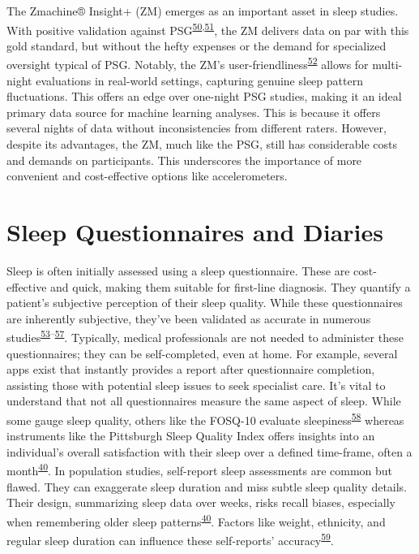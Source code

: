 \documentclass[
  10pt,
]{scrbook}
\begin{document}
The Zmachine® Insight+ (ZM) emerges as an important asset in sleep
studies. With positive validation against
PSG\textsuperscript{\protect\hyperlink{ref-kaplan_performance_2014}{50},\protect\hyperlink{ref-wang_evaluation_2015}{51}},
the ZM delivers data on par with this gold standard, but without the
hefty expenses or the demand for specialized oversight typical of PSG.
Notably, the ZM's
user-friendliness\textsuperscript{\protect\hyperlink{ref-pedersen_self-administered_2021}{52}}
allows for multi-night evaluations in real-world settings, capturing
genuine sleep pattern fluctuations. This offers an edge over one-night
PSG studies, making it an ideal primary data source for machine learning
analyses. This is because it offers several nights of data without
inconsistencies from different raters. However, despite its advantages,
the ZM, much like the PSG, still has considerable costs and demands on
participants. This underscores the importance of more convenient and
cost-effective options like accelerometers.

\hypertarget{sleep-questionnaires-and-diaries}{%
\section{Sleep Questionnaires and
Diaries}\label{sleep-questionnaires-and-diaries}}

Sleep is often initially assessed using a sleep questionnaire. These are
cost-effective and quick, making them suitable for first-line diagnosis.
They quantify a patient's subjective perception of their sleep quality.
While these questionnaires are inherently subjective, they've been
validated as accurate in numerous
studies\textsuperscript{\protect\hyperlink{ref-silva_2011}{53}--\protect\hyperlink{ref-pataka_2014}{57}}.
Typically, medical professionals are not needed to administer these
questionnaires; they can be self-completed, even at home. For example,
several apps exist that instantly provides a report after questionnaire
completion, assisting those with potential sleep issues to seek
specialist care. It's vital to understand that not all questionnaires
measure the same aspect of sleep. While some gauge sleep quality, others
like the FOSQ-10 evaluate
sleepiness\textsuperscript{\protect\hyperlink{ref-chasens_2009}{58}}
whereas instruments like the Pittsburgh Sleep Quality Index offers
insights into an individual's overall satisfaction with their sleep over
a defined time-frame, often a
month\textsuperscript{\protect\hyperlink{ref-sadeh_2015}{40}}. In
population studies, self-report sleep assessments are common but flawed.
They can exaggerate sleep duration and miss subtle sleep quality
details. Their design, summarizing sleep data over weeks, risks recall
biases, especially when remembering older sleep
patterns\textsuperscript{\protect\hyperlink{ref-sadeh_2015}{40}}.
Factors like weight, ethnicity, and regular sleep duration can influence
these self-reports'
accuracy\textsuperscript{\protect\hyperlink{ref-lauderdale_2008}{59}}.
\end{document}
